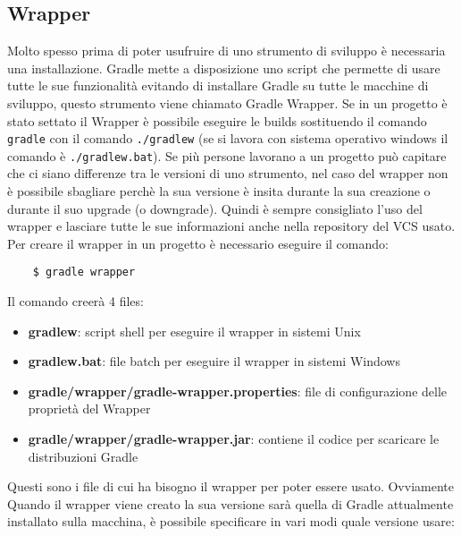 \subsection{Wrapper}
Molto spesso prima di poter usufruire di uno strumento di sviluppo è necessaria una installazione. Gradle mette a disposizione uno script che permette di usare tutte le sue funzionalità evitando di installare Gradle su tutte le macchine di sviluppo, questo strumento viene chiamato Gradle Wrapper. Se in un progetto è stato settato il Wrapper è possibile eseguire le builds sostituendo il comando \texttt{gradle} con il comando \texttt{./gradlew} (se si lavora con sistema operativo windows il comando è \texttt{./gradlew.bat}). Se più persone lavorano a un progetto può capitare che ci siano differenze tra le versioni di uno strumento, nel caso del wrapper non è possibile sbagliare perchè la sua versione è insita durante la sua creazione o durante il suo upgrade (o downgrade). Quindi è sempre consigliato l'uso del wrapper e lasciare tutte le sue informazioni anche nella repository del VCS usato. Per creare il wrapper in un progetto è necessario eseguire il comando:
\begin{verbatim}
    $ gradle wrapper\end{verbatim}
Il comando creerà 4 files:
\begin{itemize}
    \item \textbf{gradlew}: script shell per eseguire il wrapper in sistemi Unix
    \item \textbf{gradlew.bat}: file batch per eseguire il wrapper in sistemi Windows
    \item \textbf{gradle/wrapper/gradle-wrapper.properties}: file di configurazione delle proprietà del Wrapper
    \item \textbf{gradle/wrapper/gradle-wrapper.jar}: contiene il codice per scaricare le distribuzioni Gradle
\end{itemize}
Questi sono i file di cui ha bisogno il wrapper per poter essere usato. Ovviamente Quando il wrapper viene creato la sua versione sarà quella di Gradle attualmente installato sulla macchina, è possibile specificare in vari modi quale versione usare:
